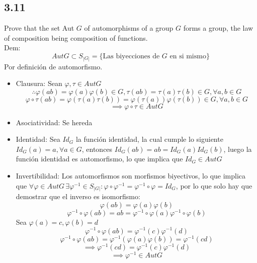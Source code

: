 \documentclass[11pt]{article}
\begin{document}
\subsection*{3.11}
Prove that the set Aut $G$ of automorphisms of a group $G$ forms a group, the law of composition being composition of functions.\\
Dem:\\
\[
Aut G\subset S_{|G|}=\{\textrm{Las biyecciones de } G \textrm{ en si mismo}\}
\]
Por definición de automorfismo.
\begin{itemize}
	\item Clausura: Sean $\varphi,\tau\in AutG$\\
	\[
	\therefore \varphi(ab)=\varphi(a)\varphi(b)\in G,\tau(ab)=\tau(a)\tau(b)\in G,\forall a,b\in G
	\]
	\[
	\varphi\circ\tau(ab)=\varphi(\tau(a)\tau(b))=\varphi(\tau(a))\varphi(\tau(b))\in G, \forall a,b\in G
	\]
	\[
	\implies \varphi\circ\tau\in AutG
	\]
	
	\item Asociatividad: Se hereda
	
	\item Identidad: Sea $Id_G$ la función identidad, la cual cumple lo siguiente $Id_G(a)=a,\forall a\in G$, entonces $Id_G(ab)=ab=Id_G(a)Id_G(b)$, luego la función identidad es automorfismo, lo que implica que $Id_G\in AutG$
	
	\item Invertibilidad: Los automorfismos son morfismos biyectivos, lo que implica que $\forall \varphi\in AutG\, \exists \varphi^{-1}\in S_{|G|}:\varphi\circ\varphi^{-1}=\varphi^{-1}\circ\varphi=Id_G$, por lo que solo hay que demostrar que el inverso es isomorfismo:
	\[
	\varphi(ab)=\varphi(a)\varphi(b)
	\]
	\[
	\varphi^{-1}\circ\varphi(ab)=ab=\varphi^{-1}\circ\varphi(a)\varphi^{-1}\circ\varphi(b)
	\]
	Sea $\varphi(a)=c,\varphi(b)=d$
	\[
	\varphi^{-1}\circ\varphi(ab)=\varphi^{-1}(c)\varphi^{-1}(d)
	\]
	\[
	\varphi^{-1}\circ\varphi(ab)=\varphi^{-1}(\varphi(a)\varphi(b))=\varphi^{-1}(cd)
	\]
	\[
	\implies \varphi^{-1}(cd)=\varphi^{-1}(c)\varphi^{-1}(d)
	\]
	\[
	\implies \varphi^{-1}\in AutG
	\]
\end{itemize}
\end{document}
